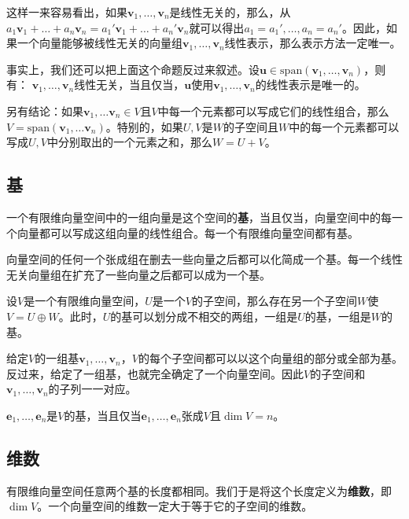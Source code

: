 这样一来容易看出，如果$\boldsymbol{v}_1, \ldots, \boldsymbol{v}_n$是线性无关的，那么，从$a_1 \boldsymbol{v}_1 + \ldots + a_n \boldsymbol{v}_n = a_1' \boldsymbol{v}_1 + \ldots + a_n' \boldsymbol{v}_n$就可以得出$a_1 = a_1', \ldots, a_n = a_n'$。因此，如果一个向量能够被线性无关的向量组$\boldsymbol{v}_1, \ldots, \boldsymbol{v}_n$线性表示，那么表示方法一定唯一。

事实上，我们还可以把上面这个命题反过来叙述。设$\boldsymbol{u} \in \mathrm{span}(\boldsymbol{v}_1, \ldots, \boldsymbol{v}_n)$，则有：
$\boldsymbol{v}_1, \ldots, \boldsymbol{v}_n$线性无关，当且仅当，$\boldsymbol{u}$使用$\boldsymbol{v}_1, \ldots, \boldsymbol{v}_n$的线性表示是唯一的。

另有结论：如果$\boldsymbol{v}_1, \ldots \boldsymbol{v}_n \in V$且$V$中每一个元素都可以写成它们的线性组合，那么$V = \mathrm{span} (\boldsymbol{v}_1, \ldots \boldsymbol{v}_n)$。特别的，如果$U,V$是$W$的子空间且$W$中的每一个元素都可以写成$U,V$中分别取出的一个元素之和，那么$W=U+V$。

\hypertarget{ux57fa}{%
\subsection{基}\label{ux57fa}}

一个有限维向量空间中的一组向量是这个空间的\textbf{基}，当且仅当，向量空间中的每一个向量都可以写成这组向量的线性组合。每一个有限维向量空间都有基。

向量空间的任何一个张成组在删去一些向量之后都可以化简成一个基。每一个线性无关向量组在扩充了一些向量之后都可以成为一个基。

设$V$是一个有限维向量空间，$U$是一个$V$的子空间，那么存在另一个子空间$W$使$V=U \oplus W$。此时，$U$的基可以划分成不相交的两组，一组是$U$的基，一组是$W$的基。

给定$V$的一组基$\boldsymbol{v}_1, \ldots, \boldsymbol{v}_n$，$V$的每个子空间都可以以这个向量组的部分或全部为基。反过来，给定了一组基，也就完全确定了一个向量空间。因此$V$的子空间和$\boldsymbol{v}_1, \ldots, \boldsymbol{v}_n$的子列一一对应。

$\boldsymbol{e}_1, \ldots, \boldsymbol{e}_n$是$V$的基，当且仅当$\boldsymbol{e}_1, \ldots, \boldsymbol{e}_n$张成$V$且$\dim V = n$。

\hypertarget{ux7ef4ux6570}{%
\subsection{维数}\label{ux7ef4ux6570}}

有限维向量空间任意两个基的长度都相同。我们于是将这个长度定义为\textbf{维数}，即$\dim V$。一个向量空间的维数一定大于等于它的子空间的维数。

